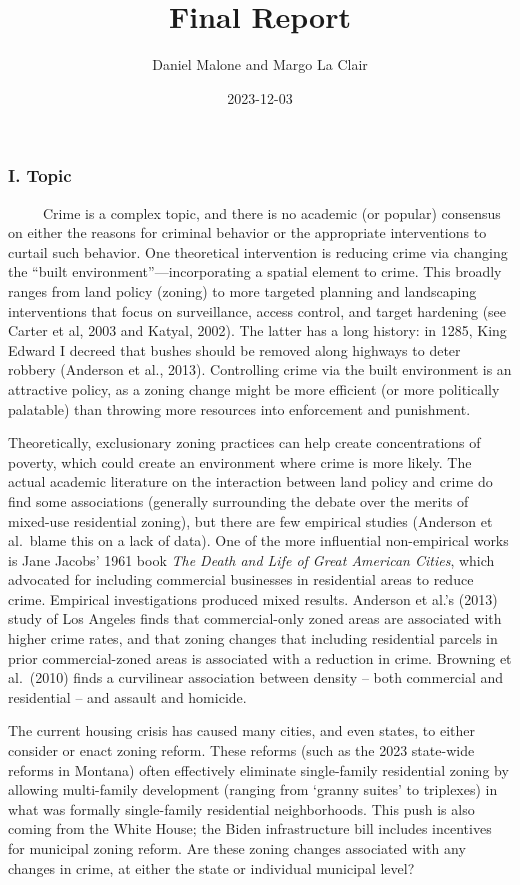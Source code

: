 \documentclass[
  12pt,
]{article}
\title{Final Report}
\author{Daniel Malone and Margo La Clair}
\date{2023-12-03}
\begin{document}
\maketitle

\hypertarget{i.-topic}{%
\subsubsection{I. Topic}\label{i.-topic}}

\setlength\parindent{24pt}

~~~~~Crime is a complex topic, and there is no academic (or popular)
consensus on either the reasons for criminal behavior or the appropriate
interventions to curtail such behavior. One theoretical intervention is
reducing crime via changing the ``built environment''---incorporating a
spatial element to crime. This broadly ranges from land policy (zoning)
to more targeted planning and landscaping interventions that focus on
surveillance, access control, and target hardening (see Carter et al,
2003 and Katyal, 2002). The latter has a long history: in 1285, King
Edward I decreed that bushes should be removed along highways to deter
robbery (Anderson et al., 2013). Controlling crime via the built
environment is an attractive policy, as a zoning change might be more
efficient (or more politically palatable) than throwing more resources
into enforcement and punishment.

Theoretically, exclusionary zoning practices can help create
concentrations of poverty, which could create an environment where crime
is more likely. The actual academic literature on the interaction
between land policy and crime do find some associations (generally
surrounding the debate over the merits of mixed-use residential zoning),
but there are few empirical studies (Anderson et al.~blame this on a
lack of data). One of the more influential non-empirical works is Jane
Jacobs' 1961 book \emph{The Death and Life of Great American Cities},
which advocated for including commercial businesses in residential areas
to reduce crime. Empirical investigations produced mixed results.
Anderson et al.'s (2013) study of Los Angeles finds that commercial-only
zoned areas are associated with higher crime rates, and that zoning
changes that including residential parcels in prior commercial-zoned
areas is associated with a reduction in crime. Browning et al.~(2010)
finds a curvilinear association between density -- both commercial and
residential -- and assault and homicide.

The current housing crisis has caused many cities, and even states, to
either consider or enact zoning reform. These reforms (such as the 2023
state-wide reforms in Montana) often effectively eliminate single-family
residential zoning by allowing multi-family development (ranging from
`granny suites' to triplexes) in what was formally single-family
residential neighborhoods. This push is also coming from the White
House; the Biden infrastructure bill includes incentives for municipal
zoning reform. Are these zoning changes associated with any changes in
crime, at either the state or individual municipal level?
\end{document}
